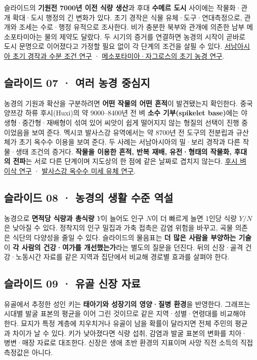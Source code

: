 \documentclass[10pt,a4paper]{article}
\begin{document}
슬라이드의 \textbf{기원전 7000년 이전 식량 생산}과 후대 \textbf{수메르 도시} 사이에는 작물화·관개 확대·도시 행정의 긴 변화가 있다. 초기 경작은 식물 유체·도구·연대측정으로, 관개와 조세는 수로·행정 유적으로 조사한다. 비가 충분한 북부와 관개에 의존한 남부 메소포타미아는 물의 제약도 달랐다. 두 시기의 증거를 연결하면 농경의 시작이 곧바로 도시 문명으로 이어졌다고 가정할 필요 없이 각 단계의 조건을 살필 수 있다. \href{https://www.nature.com/articles/ncomms4953}{서남아시아 초기 경작과 수분 조건 연구} · \href{https://www.cambridge.org/core/journals/proceedings-of-the-prehistoric-society/article/abs/background-and-development-of-early-farming-communities-in-mesopotamia-and-the-zagros/5E8DCB577EF2126257406F803465F878}{메소포타미아·자그로스의 초기 농경 연구}.\par

\subsection{슬라이드 07 · 여러 농경 중심지}
농경의 기원과 확산을 구분하려면 \textbf{어떤 작물의 어떤 흔적}이 발견됐는지 확인한다. 중국 양쯔강 하류 후시(Huxi)의 약 9000–8400년 전 벼 \textbf{소수 기부(spikelet base)}에는 야생형·중간형·재배형이 섞여 있어 씨앗이 쉽게 떨어지지 않는 형질의 선택이 진행 중이었음을 보여 준다. 멕시코 발사스강 유역에서는 약 8700년 전 도구의 전분립과 규산체가 초기 옥수수 이용을 보여 준다. 두 사례는 서남아시아의 밀·보리 경작과 다른 작물·생태 조건의 증거다. \textbf{작물을 이용한 흔적, 반복 재배, 유전·형태의 작물화, 후대의 전파}는 서로 다른 단계이며 지도상의 한 점에 같은 날짜로 겹치지 않는다. \href{https://www.nature.com/articles/srep28136}{후시 벼 이삭 연구} · \href{https://pmc.ncbi.nlm.nih.gov/articles/PMC2664021/}{발사스강 옥수수 미세 유체 연구}.\par

\subsection{슬라이드 08 · 농경의 생활 수준 역설}
농경으로 \textbf{면적당 식량과 총식량 $Y$}이 늘어도 인구 $N$이 더 빠르게 늘면 1인당 식량 $Y/N$은 낮아질 수 있다. 정착지의 인구 밀집과 가축 접촉은 감염 위험을 바꾸고, 곡물 의존은 식단의 다양성을 줄일 수 있다. 슬라이드의 물음표는 \textbf{더 많은 사람을 부양하는 기술}이 \textbf{각 사람의 건강·여가를 개선했는가}라는 별도의 질문을 던진다. 뒤의 신장·골격 건강·노동시간 자료를 같은 지역과 집단에서 비교해 경로별 효과를 살펴야 한다.\par

\subsection{슬라이드 09 · 유골 신장 자료}
유골에서 추정한 성인 키는 \textbf{태아기와 성장기의 영양·질병 환경}을 반영한다. 그래프는 시대별 발굴 표본의 평균을 이어 그린 것이므로 같은 지역·성별·연령대를 비교해야 한다. 묘지가 특정 계층에 치우치거나 유골이 남을 확률이 달라지면 전체 주민의 평균과 차이가 날 수 있다. 키가 낮아졌다면 식량 섭취, 감염과 발굴 표본의 변화를 치아·병변·매장 자료로 대조한다. 신장은 생애 초반 환경의 지표이며 사망 직전 소득의 직접 측정값은 아니다.\par
\end{document}
